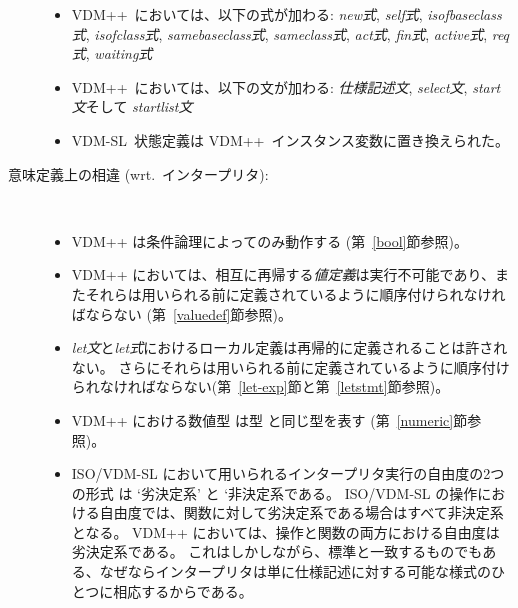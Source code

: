 \documentclass[\pformat,12pt]{jarticle}
\newcommand{\vdmslpp}[2]{%
#2
}
\newcommand{\vdmsl}{VDM-SL}
\newcommand{\vdmpp}{VDM++}
\begin{document}
\begin{description}
\begin{itemize}
  \item  \vdmpp\ においては、以下の式が加わる:
    {\em new式}, {\em self式}, {\em isofbaseclass式}, {\em 
    isofclass式}, {\em samebaseclass式}, {\em
    sameclass式}, {\em act式}, {\em fin式},
    {\em active式}, {\em req式}, {\em waiting式}

  \item  \vdmpp\ においては、以下の文が加わる:
 {\em  仕様記述文}, {\em select文},
 {\em start文}そして {\em startlist文} %

  \item  \vdmsl\ 状態定義は \vdmpp\ インスタンス変数に置き換えられた。


  \end{itemize}
  
\item[意味定義上の相違 (wrt.\ インタープリタ):]\mbox{}\\[-3mm] 
  \begin{itemize}
  
  \item  \vdmslpp{\vdmsl}{\vdmpp} は条件論理によってのみ動作する (第~\ref{bool}節参照)。
    

  \item  \vdmslpp{\vdmsl}{\vdmpp}においては、相互に再帰する{\it 値定義\/}は実行不可能であり、またそれらは用いられる前に定義されているように順序付けられなければならない (第~\ref{valuedef}節参照)。
    
  \item  {\it let文\/}と{\it  let式\/}におけるローカル定義は再帰的に定義されることは許されない。
さらにそれらは用いられる前に定義されているように順序付けられなければならない(第~\ref{let-exp}節と第~\ref{letstmt}節参照)。 
    
  \item \vdmslpp{\vdmsl}{\vdmpp}における数値型  は型 と同じ型を表す (第~\ref{numeric}節参照)。   
      
  \item   ISO/VDM-SL において用いられるインタープリタ実行の自由度の2つの形式 は `劣決定系' と `非決定系である。 
 ISO/VDM-SL の操作における自由度では、関数に対して劣決定系である場合はすべて非決定系となる。
 \vdmslpp{\vdmsl}{\vdmpp}においては、操作と関数の両方における自由度は劣決定系である。
これはしかしながら、標準と一致するものでもある、なぜならインタープリタは単に仕様記述に対する可能な様式のひとつに相応するからである。

  \end{itemize}
\end{description}
\end{document}
